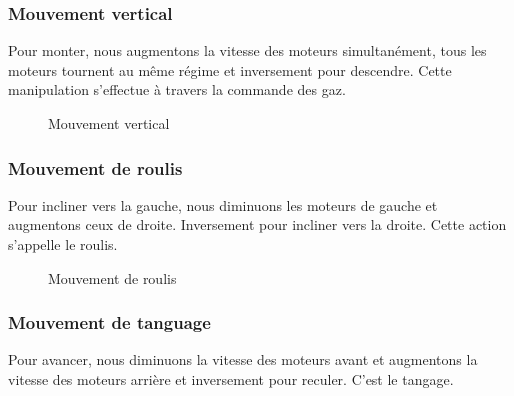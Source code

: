 \subsubsection{Mouvement vertical}
Pour monter, nous augmentons la vitesse des moteurs simultanément, tous les moteurs tournent au même régime et inversement pour descendre. Cette manipulation s'effectue à travers la commande des gaz.
\begin{figure} [H]
\begin{center}
	\centering
\end{center}
\caption{Mouvement vertical}
\end{figure}

\subsubsection{Mouvement de roulis}
Pour incliner vers la gauche, nous diminuons les moteurs de gauche et augmentons ceux de droite. Inversement pour incliner vers la droite. Cette action s'appelle le roulis.
\begin{figure} [H]
\begin{center}
	
	\caption{Mouvement de roulis}
\end{center}
\end{figure}
\subsubsection{Mouvement de tanguage}
Pour avancer, nous diminuons la vitesse des moteurs avant et augmentons la vitesse des moteurs arrière et inversement pour reculer. C'est le tangage.


